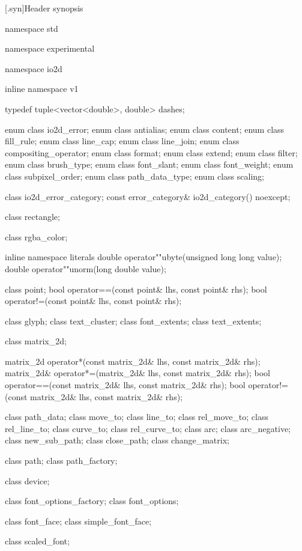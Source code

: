 [\iotwod.syn]{Header  synopsis}

%
\begin{codeblock}

namespace std { namespace experimental { namespace io2d { inline namespace v1 {
  typedef tuple<vector<double>, double> dashes;

  enum class io2d_error;
  enum class antialias;
  enum class content;
  enum class fill_rule;
  enum class line_cap;
  enum class line_join;
  enum class compositing_operator;
  enum class format;
  enum class extend;
  enum class filter;
  enum class brush_type;
  enum class font_slant;
  enum class font_weight;
  enum class subpixel_order;
  enum class path_data_type;
  enum class scaling;

  class io2d_error_category;
  const error_category& io2d_category() noexcept;

  class rectangle;

  class rgba_color;

  inline namespace literals {
    double operator""ubyte(unsigned long long value);
    double operator""unorm(long double value);
  }
  
  class point;
  bool operator==(const point& lhs, const point& rhs);
  bool operator!=(const point& lhs, const point& rhs);

  class glyph;
  class text_cluster;
  class font_extents;
  class text_extents;

  class matrix_2d;

  matrix_2d operator*(const matrix_2d& lhs, const matrix_2d& rhs);
  matrix_2d& operator*=(matrix_2d& lhs, const matrix_2d& rhs);
  bool operator==(const matrix_2d& lhs, const matrix_2d& rhs);
  bool operator!=(const matrix_2d& lhs, const matrix_2d& rhs);

  class path_data;
  class move_to;
  class line_to;
  class rel_move_to;
  class rel_line_to;
  class curve_to;
  class rel_curve_to;
  class arc;
  class arc_negative;
  class new_sub_path;
  class close_path;
  class change_matrix;
  
  class path;
  class path_factory;
  
  class device;

  class font_options_factory;
  class font_options;

  class font_face;
  class simple_font_face;

  class scaled_font;

}}}}
\end{codeblock}
